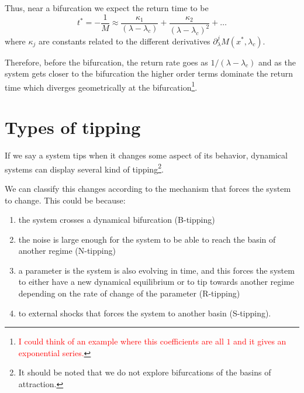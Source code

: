 Thus, near a bifurcation we expect the return time to be 
\begin{equation}
	t^*=-\frac{1}{M}\approx \frac{\kappa_1}{(\lambda-\lambda_c)}+\frac{\kappa_2}{(\lambda-\lambda_c)^2}+\dots
\end{equation}
where $\kappa_j$ are constants related to the different derivatives $\partial^j_\lambda M(x^*,\lambda_c)$.

Therefore, before the bifurcation, the return rate goes as  $1/(\lambda-\lambda_c)$ and as the system gets closer to the bifurcation the higher order terms dominate the return time which diverges geometrically at the bifurcation\footnote{\textcolor{red}{I could think of an example where this coefficients are all $1$ and it gives an exponential series.}}.


\section{Types of tipping}

If we say a system tips when it changes some aspect of its behavior, dynamical systems can display several kind of tipping\footnote{It should be noted that we do not explore bifurcations of the basins of attraction.}.

We can classify this changes according to the mechanism that forces the system to change. This could be because:
\begin{enumerate}
	\item the system crosses a dynamical bifurcation (B-tipping)
	\item   the noise is large enough for the system to be able to reach  the basin of another regime (N-tipping)
	 \item  a parameter is the system is also evolving in time, and this forces the system to either have a new dynamical equilibrium or to tip towards another regime depending on the rate of change of the parameter (R-tipping)
	 \item to external shocks that forces the system to another basin (S-tipping).
\end{enumerate} 

